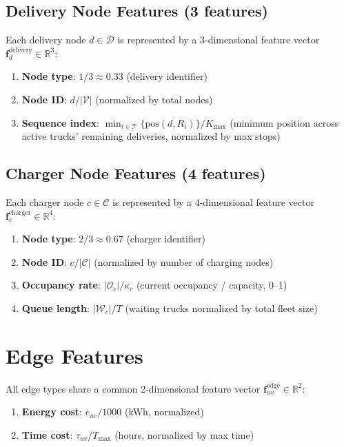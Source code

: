 \documentclass[11pt]{article}
\begin{document}
\subsection{Delivery Node Features (3 features)}

Each delivery node $d \in \mathcal{D}$ is represented by a 3-dimensional feature vector $\mathbf{f}_d^{\text{delivery}} \in \mathbb{R}^{3}$:

\begin{enumerate}[nosep]
    \item \textbf{Node type}: $1 / 3 \approx 0.33$ (delivery identifier)
    \item \textbf{Node ID}: $d / |\mathcal{V}|$ (normalized by total nodes)
    \item \textbf{Sequence index}: $\min_{i \in \mathcal{T}} \{ \text{pos}(d, R_i) \} / K_{\max}$ (minimum position across active trucks' remaining deliveries, normalized by max stops)
\end{enumerate}

\subsection{Charger Node Features (4 features)}

Each charger node $c \in \mathcal{C}$ is represented by a 4-dimensional feature vector $\mathbf{f}_c^{\text{charger}} \in \mathbb{R}^{4}$:

\begin{enumerate}[nosep]
    \item \textbf{Node type}: $2 / 3 \approx 0.67$ (charger identifier)
    \item \textbf{Node ID}: $c / |\mathcal{C}|$ (normalized by number of charging nodes)
    \item \textbf{Occupancy rate}: $|\mathcal{O}_c| / \kappa_c$ (current occupancy / capacity, 0--1)
    \item \textbf{Queue length}: $|\mathcal{W}_c| / T$ (waiting trucks normalized by total fleet size)
\end{enumerate}

\section{Edge Features}

All edge types share a common 2-dimensional feature vector $\mathbf{f}_{uv}^{\text{edge}} \in \mathbb{R}^{2}$:

\begin{enumerate}[nosep]
    \item \textbf{Energy cost}: $e_{uv} / 1000$ (kWh, normalized)
    \item \textbf{Time cost}: $\tau_{uv} / T_{\max}$ (hours, normalized by max time)
\end{enumerate}
\end{document}

